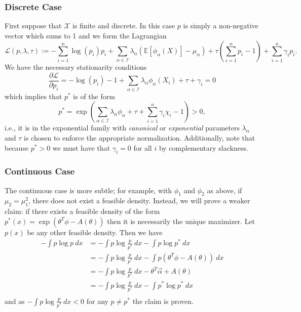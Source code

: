 \subsubsection{Discrete Case}
First suppose that $\mathcal{X}$ is finite and discrete.  In this case $p$ is simply a non-negative vector which sums to 1 and we form the Lagrangian
$$
\mathcal{L}(p, \lambda, \tau) := - \sum_{i=1}^n\log(p_i)p_i + \sum_{\alpha\in\mathcal{I}} \lambda_\alpha \left(\mathbb{E}[\phi_\alpha(X)] - \mu_\alpha\right) + \tau (\sum_{i=1}^n p_i - 1) + \sum_{i=1}^n\gamma_i p_i.
$$
We have the necessary stationarity conditions
$$
\frac{\partial \mathcal{L}}{\partial p_i} = -\log(p_i) - 1 + \sum_{\alpha\in\mathcal{I}} \lambda_\alpha\phi_\alpha(X_i) + \tau + \gamma_i= 0
$$
which implies that $p^*$ is of the form
$$
p^* = \exp\left(\sum_{\alpha\in\mathcal{I}} \lambda_\alpha\phi_\alpha + \tau + \sum_{i=1}^n\gamma_i\chi_i - 1\right) > 0,
$$
i.e., it is in the exponential family with \emph{canonical} or \emph{exponential} parameters $\lambda_\alpha$ and $\tau$ is chosen to enforce the appropriate normalization.  Additionally, note that because $p^* > 0$ we must have that $\gamma_i = 0$ for all $i$ by complementary slackness.


\subsubsection{Continuous Case}

The continuous case is more subtle; for example, with $\phi_1$ and $\phi_2$ as above, if $\mu_2 = \mu_1^2$, there does not exist a feasible density.  Instead, we will prove a weaker claim: if there exists a feasible density of the form $p^*(x) = \exp\left(\theta^T\phi - A(\theta)\right)$ then it is necessarily the unique maximizer.  Let $p(x)$ be any other feasible density.  Then we have
\begin{equation*}
\begin{aligned}
-\int p \log p\ dx &= -\int p \log \frac{p}{p^*}\ dx - \int p \log p^*\ dx \\
&= -\int p \log \frac{p}{p^*}\ dx - \int p\left(\theta^T\phi - A(\theta)\right) \ dx \\
&= -\int p \log \frac{p}{p^*}\ dx - \theta^T\vec{\alpha} + A(\theta) \\
&= -\int p \log \frac{p}{p^*}\ dx - \int p^* \log p^*\ dx \\
\end{aligned}
\end{equation*}
and as $-\int p \log \frac{p}{p^*}\ dx < 0$ for any $p \neq p^*$ the claim is proven.